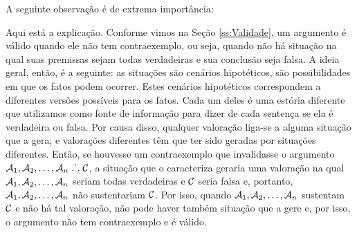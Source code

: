 A seguinte observação é de extrema importância:

Aqui está a explicação.
Conforme vimos na Seção \ref{ss:Validade}, um argumento é válido quando ele não tem contraexemplo, ou seja, quando não há situação na qual suas premissas sejam todas verdadeiras e sua conclusão seja falsa.
A ideia geral, então, é a seguinte:
as situações são cenários hipotéticos, são possibilidades em que os fatos podem ocorrer.
Estes cenários hipotéticos correspondem a diferentes versões possíveis para os fatos.
Cada um deles é uma estória diferente que utilizamos como fonte de informação para dizer de cada sentença se ela é verdadeira ou falsa.
Por causa disso, qualquer valoração liga-se a alguma situação que a gera; e valorações diferentes têm que ter sido geradas por situações diferentes.
Então, se houvesse um contraexemplo que invalidasse o argumento $\mathcal{A}_1, \mathcal{A}_2, \ldots, \mathcal{A}_n \mathrel{\ldotp\dot{}\,\ldotp} \mathcal{C}$, a situação que o caracteriza geraria uma valoração na qual $\mathcal{A}_1, \mathcal{A}_2, \ldots, \mathcal{A}_n$ seriam todas verdadeiras e $\mathcal{C}$ seria falsa e, portanto, $\mathcal{A}_1, \mathcal{A}_2, \ldots, \mathcal{A}_n$ não sustentariam $\mathcal{C}$.
Por isso, quando $\mathcal{A}_1, \mathcal{A}_2, \ldots, \mathcal{A}_n$ sustentam $\mathcal{C}$ e não há tal valoração, não pode haver também situação que a gere e, por isso, o argumento não tem contraexemplo e é válido.

